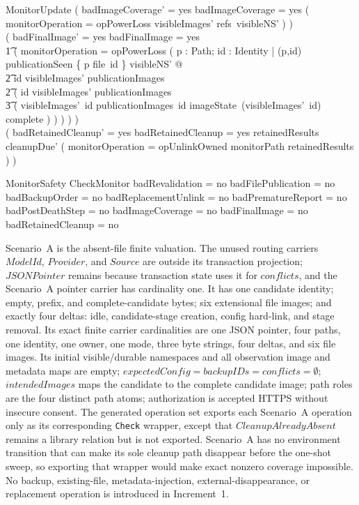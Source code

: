 \documentclass{article}
\begin{document}
\begin{schema}{MonitorUpdate}
	( badImageCoverage' = yes \iff badImageCoverage = yes \lor
	( monitorOperation = opPowerLoss \land \dom visibleImages' \neq refs~visibleNS' ) ) \\
	( badFinalImage' = yes \iff badFinalImage = yes \lor \\
	\t1 ( monitorOperation = opPowerLoss \land
	( \exists p : Path; id : Identity | (p,id) \in publicationSeen \land
	\{ p \mapsto file~id \} \subseteq visibleNS' @ \\
	\t2 id \notin \dom visibleImages' \cap \dom publicationImages \lor \\
	\t2 ( id \in \dom visibleImages' \cap \dom publicationImages \land \\
	\t3 ( visibleImages'~id \neq publicationImages~id \lor
	imageState~(visibleImages'~id) \neq complete ) ) ) ) ) \\
	( badRetainedCleanup' = yes \iff badRetainedCleanup = yes \lor
	\dom retainedResults \cap \dom cleanupDue' \neq \emptyset \lor
	( monitorOperation = opUnlinkOwned \land
	monitorPath \cap \dom retainedResults \neq \emptyset ) )
\end{schema}

\begin{schema}{MonitorSafety}
	CheckMonitor
	\where
	badRevalidation = no \land badFilePublication = no \land
	badBackupOrder = no \land badReplacementUnlink = no \land
	badPrematureReport = no \land badPostDeathStep = no \land
	badImageCoverage = no \land badFinalImage = no \land
	badRetainedCleanup = no
\end{schema}

Scenario~A is the absent-file finite valuation.  The unused routing carriers
$ModelId$, $Provider$, and $Source$ are outside its transaction projection;
$JSONPointer$ remains because transaction state uses it for $conflicts$, and the
Scenario~A pointer carrier has cardinality one.  It has one candidate identity;
empty, prefix, and complete-candidate bytes; six extensional file images; and
exactly four deltas: idle, candidate-stage creation, config hard-link, and stage
removal.  Its exact finite carrier cardinalities are one JSON pointer, four
paths, one identity, one owner, one mode, three byte strings, four deltas, and
six file images.  Its initial visible/durable namespaces and all observation
image and metadata maps are empty; $expectedConfig=backupIDs=conflicts=\emptyset$;
$intendedImages$ maps the candidate to the complete candidate image; path roles
are the four distinct path atoms; authorization is accepted HTTPS without
insecure consent.  The generated operation set exports each Scenario~A operation
only as its corresponding \texttt{Check} wrapper, except that
$CleanupAlreadyAbsent$ remains a library relation but is not exported.  Scenario~A
has no environment transition that can make its sole cleanup path disappear
before the one-shot sweep, so exporting that wrapper would make exact nonzero
coverage impossible.  No backup, existing-file, metadata-injection,
external-disappearance, or replacement operation is introduced in Increment~1.
\end{document}
